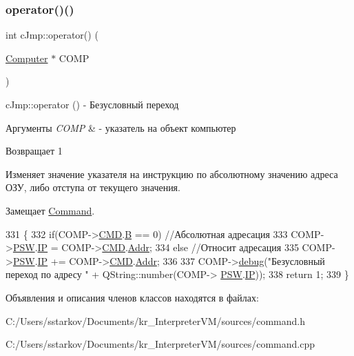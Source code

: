 \subsubsection{\texorpdfstring{operator()()}{operator()()}}
{\footnotesize\ttfamily int c\+Jmp\+::operator() (\begin{DoxyParamCaption}\item[{\hyperlink{class_computer}{Computer} $\ast$}]{C\+O\+MP }\end{DoxyParamCaption})\hspace{0.3cm}{\ttfamily [virtual]}}



c\+Jmp\+::operator () -\/ Безусловный переход 


\begin{DoxyParams}{Аргументы}
{\em C\+O\+MP} & -\/ указатель на объект компьютер \\
\hline
\end{DoxyParams}
\begin{DoxyReturn}{Возвращает}
1
\end{DoxyReturn}
Изменяет значение указателя на инструкцию по абсолютному значению адреса ОЗУ, либо отступа от текущего значения. 

Замещает \hyperlink{class_command_a79939b66f3de892e91d7710844294716}{Command}.


\begin{DoxyCode}
331 \{
332     \textcolor{keywordflow}{if}(COMP->\hyperlink{class_computer_a8423168f7cc356b4dd36977603798caf}{CMD}.\hyperlink{struct_computer_1_1command_a3e0d1e527de9f60594023a362b08a7de}{B} == 0) \textcolor{comment}{//Абсолютная адресация}
333         COMP->\hyperlink{class_computer_aada011a29d87bb979835371a5f09805e}{PSW}.\hyperlink{struct_computer_1_1bits_a7781883b446209714ad687e2a4f77526}{IP} = COMP->\hyperlink{class_computer_a8423168f7cc356b4dd36977603798caf}{CMD}.\hyperlink{struct_computer_1_1command_a0e07591012953413797506f7bc3cb1a7}{Addr};
334     \textcolor{keywordflow}{else} \textcolor{comment}{//Относит адресация}
335         COMP->\hyperlink{class_computer_aada011a29d87bb979835371a5f09805e}{PSW}.\hyperlink{struct_computer_1_1bits_a7781883b446209714ad687e2a4f77526}{IP} += COMP->\hyperlink{class_computer_a8423168f7cc356b4dd36977603798caf}{CMD}.\hyperlink{struct_computer_1_1command_a0e07591012953413797506f7bc3cb1a7}{Addr};
336 
337     COMP->\hyperlink{class_computer_a10ca6c6b200630119201de16d7368e0f}{debug}(\textcolor{stringliteral}{"Безусловный переход по адресу "} + QString::number(COMP->
      \hyperlink{class_computer_aada011a29d87bb979835371a5f09805e}{PSW}.\hyperlink{struct_computer_1_1bits_a7781883b446209714ad687e2a4f77526}{IP}));
338     \textcolor{keywordflow}{return} 1;
339 \}
\end{DoxyCode}


Объявления и описания членов классов находятся в файлах\+:\begin{DoxyCompactItemize}
\item 
C\+:/\+Users/sstarkov/\+Documents/kr\+\_\+\+Interpreter\+V\+M/sources/command.\+h\item 
C\+:/\+Users/sstarkov/\+Documents/kr\+\_\+\+Interpreter\+V\+M/sources/command.\+cpp\end{DoxyCompactItemize}
